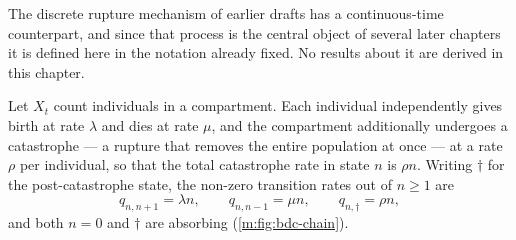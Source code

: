 The discrete rupture mechanism of earlier drafts has a continuous-time counterpart,
and since that process is the central object of several later chapters it is defined
here in the notation already fixed. No results about it are derived in this chapter.

\begin{definition}
\label{m:def:bdc}
Let $X_t$ count individuals in a compartment. Each individual independently gives
birth at rate $\lambda$ and dies at rate $\mu$, and the compartment additionally
undergoes a catastrophe --- a rupture that removes the entire population at once
--- at a rate $\rho$ per individual, so that the total catastrophe rate in state
$n$ is $\rho n$. Writing $\dagger$ for the post-catastrophe state, the non-zero
transition rates out of $n\ge1$ are
\begin{equation}
\label{m:eq:bdcrates}
q_{n,n+1} = \lambda n,
\qquad
q_{n,n-1} = \mu n,
\qquad
q_{n,\dagger} = \rho n ,
\end{equation}
and both $n=0$ and $\dagger$ are absorbing (\cref{m:fig:bdc-chain}).
\end{definition}

